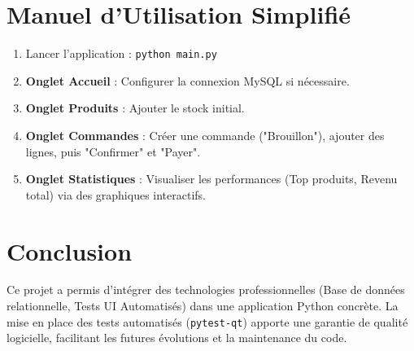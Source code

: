 \documentclass[12pt,a4paper]{report}
\begin{document}
\section{Manuel d'Utilisation Simplifié}
\begin{enumerate}
    \item Lancer l'application : \texttt{python main.py}
    \item \textbf{Onglet Accueil} : Configurer la connexion MySQL si nécessaire.
    \item \textbf{Onglet Produits} : Ajouter le stock initial.
    \item \textbf{Onglet Commandes} : Créer une commande ("Brouillon"), ajouter des lignes, puis "Confirmer" et "Payer".
    \item \textbf{Onglet Statistiques} : Visualiser les performances (Top produits, Revenu total) via des graphiques interactifs.
\end{enumerate}

\section{Conclusion}
Ce projet a permis d'intégrer des technologies professionnelles (Base de données relationnelle, Tests UI Automatisés) dans une application Python concrète. La mise en place des tests automatisés (\texttt{pytest-qt}) apporte une garantie de qualité logicielle, facilitant les futures évolutions et la maintenance du code.
\end{document}
